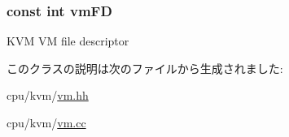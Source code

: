\label{classKvmVM_af27ccd765f13a4b7bd119dc7579e2746}
\hypertarget{classKvmVM_ad268d2f789e668c440ed8fe37f115860}{
\subsubsection[{vmFD}]{\setlength{\rightskip}{0pt plus 5cm}const int {\bf vmFD}}}
\label{classKvmVM_ad268d2f789e668c440ed8fe37f115860}
KVM VM file descriptor 

このクラスの説明は次のファイルから生成されました:\begin{DoxyCompactItemize}
\item 
cpu/kvm/\hyperlink{vm_8hh}{vm.hh}\item 
cpu/kvm/\hyperlink{vm_8cc}{vm.cc}\end{DoxyCompactItemize}
